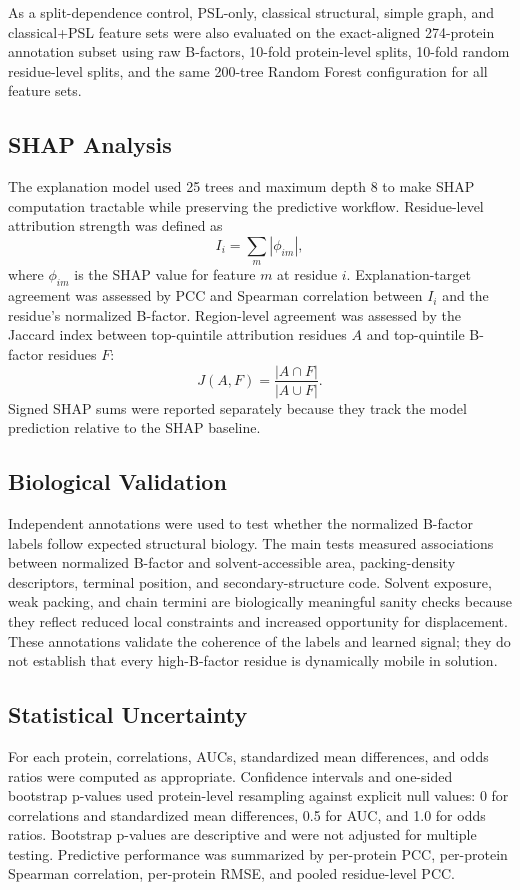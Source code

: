 \documentclass[11pt]{article}
\begin{document}
As a split-dependence control, PSL-only, classical structural, simple graph, and classical+PSL feature sets were also evaluated on the exact-aligned 274-protein annotation subset using raw B-factors, 10-fold protein-level splits, 10-fold random residue-level splits, and the same 200-tree Random Forest configuration for all feature sets.

\subsection{SHAP Analysis}
The explanation model used 25 trees and maximum depth 8 to make SHAP computation tractable while preserving the predictive workflow. Residue-level attribution strength was defined as
\begin{equation}
I_i = \sum_m |\phi_{im}|,
\end{equation}
where $\phi_{im}$ is the SHAP value for feature $m$ at residue $i$. Explanation-target agreement was assessed by PCC and Spearman correlation between $I_i$ and the residue's normalized B-factor. Region-level agreement was assessed by the Jaccard index between top-quintile attribution residues $A$ and top-quintile B-factor residues $F$:
\begin{equation}
J(A,F) = \frac{|A \cap F|}{|A \cup F|}.
\end{equation}
Signed SHAP sums were reported separately because they track the model prediction relative to the SHAP baseline.

\subsection{Biological Validation}
Independent annotations were used to test whether the normalized B-factor labels follow expected structural biology. The main tests measured associations between normalized B-factor and solvent-accessible area, packing-density descriptors, terminal position, and secondary-structure code. Solvent exposure, weak packing, and chain termini are biologically meaningful sanity checks because they reflect reduced local constraints and increased opportunity for displacement. These annotations validate the coherence of the labels and learned signal; they do not establish that every high-B-factor residue is dynamically mobile in solution.

\subsection{Statistical Uncertainty}
For each protein, correlations, AUCs, standardized mean differences, and odds ratios were computed as appropriate. Confidence intervals and one-sided bootstrap p-values used protein-level resampling against explicit null values: 0 for correlations and standardized mean differences, 0.5 for AUC, and 1.0 for odds ratios. Bootstrap p-values are descriptive and were not adjusted for multiple testing. Predictive performance was summarized by per-protein PCC, per-protein Spearman correlation, per-protein RMSE, and pooled residue-level PCC.
\end{document}
